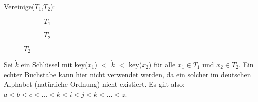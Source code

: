 \documentclass{article}
\begin{document}
\newpage
Vereinige($T_1$,$T_2$):
\begin{figure}[H]
 
  \begin{subfigure}[b]{.4\textwidth}
    \centering
    \label{subfig:aufg9-i-1-after}
    \caption{$T_1$}
  \end{subfigure}
  \quad
  \begin{subfigure}[b]{.4\textwidth}
    \centering
    \label{subfig:aufg9-i-1-after}
    \caption{$T_2$}
  \end{subfigure}
  \label{fig:aufg9-i-1} 
\end{figure}
Sei $\dot{k}$ ein Schlüssel mit key($x_1$) $<$ $\dot{k}$ $<$ key($x_2$) für alle $x_1 \in T_1$ und $x_2 \in T_2$. Ein echter Buchstabe kann hier nicht verwendet werden, da ein solcher im deutschen Alphabet (natürliche Ordnung) nicht existiert. Es gilt also: $a < b < c < ... < \dot{k} < i < j < k < ... < z$.
\end{document}
